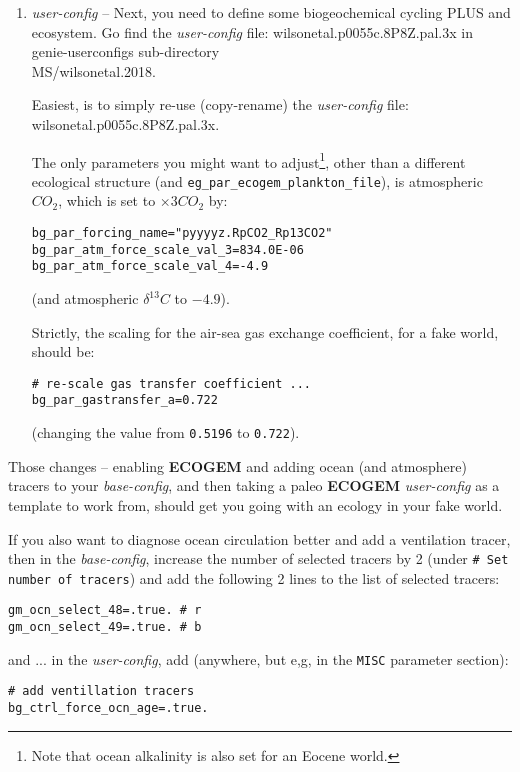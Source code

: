 \documentclass[11pt,fleqn]{book} %
\begin{document}
\begin{enumerate}[noitemsep]
\vspace{1mm}
\item \textit{user-config} -- Next, you need to define some biogeochemical cycling PLUS and ecosystem. Go find the \textit{user-config} file: \textsf{\footnotesize wilsonetal.p0055c.8P8Z.pal.3x} in \textsf{\footnotesize genie-userconfigs} sub-directory \\ \textsf{\footnotesize MS/wilsonetal.2018}.

Easiest, is to simply re-use (copy-rename) the  \textit{user-config} file: \textsf{\footnotesize wilsonetal.p0055c.8P8Z.pal.3x}.

\vspace{1mm}
The only parameters you might want to adjust\footnote{Note that ocean alkalinity is also set for an Eocene world.}, other than a different ecological structure (and \texttt{eg\_par\_ecogem\_plankton\_file}), is atmospheric \(CO_{2}\), which is set to \(\times 3 CO_{2}\) by:
\small\begin{verbatim}
bg_par_forcing_name="pyyyyz.RpCO2_Rp13CO2"
bg_par_atm_force_scale_val_3=834.0E-06
bg_par_atm_force_scale_val_4=-4.9
\end{verbatim}\normalsize
(and atmospheric \(\delta^{13}C\) to \(-4.9\)).

\vspace{1mm}
Strictly, the scaling for the air-sea gas exchange coefficient, for a fake world, should be:
\footnotesize\begin{verbatim}
# re-scale gas transfer coefficient ...
bg_par_gastransfer_a=0.722
\end{verbatim}\normalsize
(changing the value from \texttt{0.5196} to \texttt{0.722}).

\end{enumerate}

\pagebreak

Those changes -- enabling \textbf{ECOGEM} and adding ocean (and atmosphere) tracers to your \textit{base-config}, and then taking a paleo \textbf{ECOGEM} \textit{user-config} as a template to work from, should get you going with an ecology in your fake world.

\vspace{1mm}
If you also want to diagnose ocean circulation better and add a ventilation tracer, then in the \textit{base-config}, increase the number of selected tracers by 2 (under \texttt{\# Set number of tracers}) and add the following 2 lines to the list of selected tracers:
\footnotesize\begin{verbatim}
gm_ocn_select_48=.true. # r
gm_ocn_select_49=.true. # b
\end{verbatim}\normalsize
and ... in the \textit{user-config}, add (anywhere, but e,g, in the \texttt{MISC} parameter section):
\footnotesize\begin{verbatim}
# add ventillation tracers
bg_ctrl_force_ocn_age=.true.
\end{verbatim}\normalsize
\end{document}
